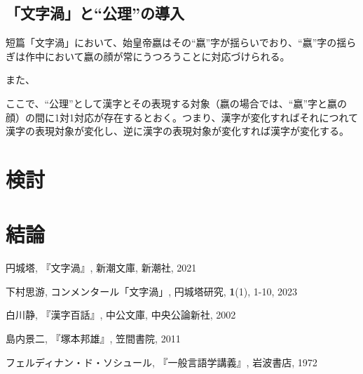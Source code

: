 \documentclass[10pt, a5paper, twoside]{jsarticle}
\theoremstyle{definition}
\begin{document}
		\subsection{「文字渦」と“公理”の導入}

			短篇「文字渦」において、始皇帝嬴はその“嬴”字が揺らいでおり、“嬴”字の揺らぎは作中において嬴の顔が常にうつろうことに対応づけられる。

			また、

			ここで、“公理”として漢字とその表現する対象（嬴の場合では、“嬴”字と嬴の顔）の間に1対1対応が存在するとおく。つまり、漢字が変化すればそれにつれて漢字の表現対象が変化し、逆に漢字の表現対象が変化すれば漢字が変化する。

	\section{検討}

	\section{結論}

	\begin{thebibliography}{99}

		 円城塔, 『文字渦』, 新潮文庫, 新潮社, 2021

		 下村思游, コンメンタール「文字渦」, 円城塔研究, \textbf{1}(1), 1-10, 2023

		 白川静, 『漢字百話』, 中公文庫, 中央公論新社, 2002

		 島内景二, 『塚本邦雄』, 笠間書院, 2011

		 フェルディナン・ド・ソシュール, 『一般言語学講義』, 岩波書店, 1972

	\end{thebibliography}
\end{document}
